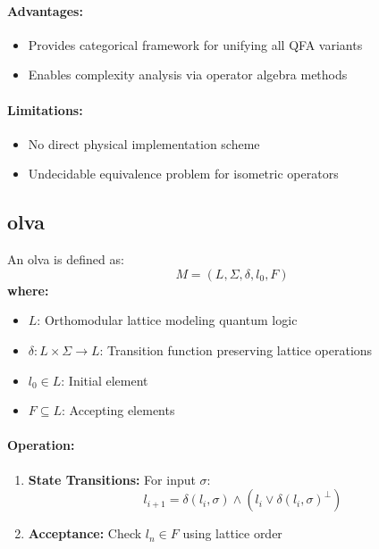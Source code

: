 \paragraph{Advantages:}
\begin{itemize}
    \item Provides categorical framework for unifying all QFA variants
    \item Enables complexity analysis via operator algebra methods
\end{itemize}

\paragraph{Limitations:}
\begin{itemize}
    \item No direct physical implementation scheme
    \item Undecidable equivalence problem for isometric operators
\end{itemize}

\subsection{\acrfull{olva}}
\label{subsec:olva}

\begin{definition}
An \gls{olva} is defined as:
\[
M = (L, \Sigma, \delta, l_0, F)
\]
\textbf{where:}
\begin{itemize}
    \item $L$: Orthomodular lattice modeling quantum logic
    \item $\delta: L \times \Sigma \rightarrow L$: Transition function preserving lattice operations
    \item $l_0 \in L$: Initial element
    \item $F \subseteq L$: Accepting elements
\end{itemize}
\end{definition}

\paragraph{Operation:}
\begin{enumerate}
    \item \textbf{State Transitions:} For input $\sigma$:
\[
l_{i+1} = \delta(l_i, \sigma) \land (l_i \lor \delta(l_i, \sigma)^\perp)
\]
    \item \textbf{Acceptance:} Check $l_n \in F$ using lattice order
\end{enumerate}


